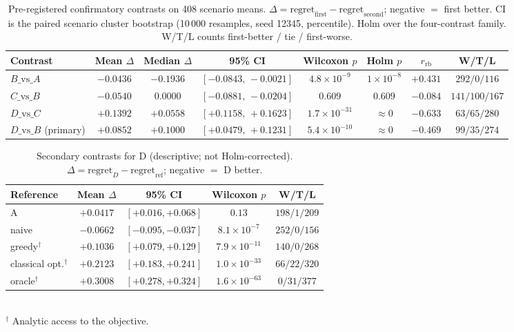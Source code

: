 \documentclass[10pt,twocolumn,a4paper]{article}
\newcommand{\rb}{\ensuremath{r_{\mathrm{rb}}}}
\begin{document}
\begin{table}[tbp]
\caption{Pre-registered confirmatory contrasts on 408 scenario means.
$\Delta = \mathrm{regret}_{\text{first}}-\mathrm{regret}_{\text{second}}$;
negative $=$ first better. CI is the paired scenario cluster bootstrap
(10\,000 resamples, seed 12345, percentile). Holm over the four-contrast family.
W/T/L counts first-better / tie / first-worse.}
\label{tab:confirm}
\centering
\small
\begin{tabular}{lccccccc}
\toprule
Contrast & Mean $\Delta$ & Median $\Delta$ & 95\% CI & Wilcoxon $p$ & Holm $p$ & \rb & W/T/L \\
\midrule
$B\text{\_vs\_}A$ & $-0.0436$ & $-0.1936$ & $[-0.0843,\,-0.0021]$ & $4.8\times10^{-9}$ & $1\times10^{-8}$ & $+0.431$ & $292/0/116$ \\
$C\text{\_vs\_}B$ & $-0.0540$ & $0.0000$ & $[-0.0881,\,-0.0204]$ & $0.609$ & $0.609$ & $-0.084$ & $141/100/167$ \\
$D\text{\_vs\_}C$ & $+0.1392$ & $+0.0558$ & $[+0.1158,\,+0.1623]$ & $1.7\times10^{-31}$ & $\approx0$ & $-0.633$ & $63/65/280$ \\
$D\text{\_vs\_}B$ (primary) & $+0.0852$ & $+0.1000$ & $[+0.0479,\,+0.1231]$ & $5.4\times10^{-10}$ & $\approx0$ & $-0.469$ & $99/35/274$ \\
\bottomrule
\end{tabular}
\end{table}

\begin{table}[tbp]
\caption{Secondary contrasts for D (descriptive; not Holm-corrected).
$\Delta = \mathrm{regret}_D-\mathrm{regret}_{\text{ref}}$; negative $=$ D better.}
\label{tab:secondary}
\centering
\small
\begin{tabular}{lcccc}
\toprule
Reference & Mean $\Delta$ & 95\% CI & Wilcoxon $p$ & W/T/L \\
\midrule
A                   & $+0.0417$ & $[+0.016,+0.068]$ & $0.13$              & $198/1/209$ \\
naive               & $-0.0662$ & $[-0.095,-0.037]$ & $8.1\times10^{-7}$  & $252/0/156$ \\
greedy$^\dagger$    & $+0.1036$ & $[+0.079,+0.129]$ & $7.9\times10^{-11}$ & $140/0/268$ \\
classical opt.$^\dagger$ & $+0.2123$ & $[+0.183,+0.241]$ & $1.0\times10^{-33}$ & $66/22/320$ \\
oracle$^\dagger$    & $+0.3008$ & $[+0.278,+0.324]$ & $1.6\times10^{-63}$ & $0/31/377$ \\
\bottomrule
\end{tabular}\\[2pt]
{\footnotesize $^\dagger$ Analytic access to the objective.}
\end{table}
\end{document}
